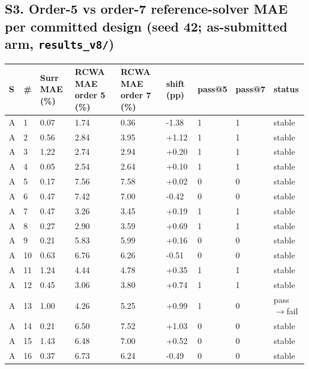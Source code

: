 \documentclass[11pt,a4paper]{article}
\newcounter{none}   %
\begin{document}
\begin{landscape}
\section*{\texorpdfstring{S3. Order-5 vs order-7 reference-solver MAE per committed design (seed 42; \textbf{as-submitted arm}, \texttt{results\_v8/})}{S3. Order-5 vs order-7 reference-solver MAE per committed design (seed 42; as-submitted arm, results\_v8/)}}

\begingroup
\setlength{\tabcolsep}{3pt}\footnotesize
{}
\label{stab:3}
{\def\LTcaptype{none} %
\begin{longtable}[]{@{}lllllllll@{}}
\toprule\noalign{}
S & \# & Surr MAE (\%) & RCWA MAE order 5 (\%) & RCWA MAE order 7 (\%) & shift (pp) & pass@5 & pass@7 & status \\
\midrule\noalign{}
\endhead
\bottomrule\noalign{}
\endlastfoot
A & 1 & 0.07 & 1.74 & 0.36 & -1.38 & 1 & 1 & stable \\
A & 2 & 0.56 & 2.84 & 3.95 & +1.12 & 1 & 1 & stable \\
A & 3 & 1.22 & 2.74 & 2.94 & +0.20 & 1 & 1 & stable \\
A & 4 & 0.05 & 2.54 & 2.64 & +0.10 & 1 & 1 & stable \\
A & 5 & 0.17 & 7.56 & 7.58 & +0.02 & 0 & 0 & stable \\
A & 6 & 0.47 & 7.42 & 7.00 & -0.42 & 0 & 0 & stable \\
A & 7 & 0.47 & 3.26 & 3.45 & +0.19 & 1 & 1 & stable \\
A & 8 & 0.27 & 2.90 & 3.59 & +0.69 & 1 & 1 & stable \\
A & 9 & 0.21 & 5.83 & 5.99 & +0.16 & 0 & 0 & stable \\
A & 10 & 0.63 & 6.76 & 6.26 & -0.51 & 0 & 0 & stable \\
A & 11 & 1.24 & 4.44 & 4.78 & +0.35 & 1 & 1 & stable \\
A & 12 & 0.45 & 3.06 & 3.80 & +0.74 & 1 & 1 & stable \\
A & 13 & 1.00 & 4.26 & 5.25 & +0.99 & 1 & 0 & pass\ensuremath{\rightarrow}fail \\
A & 14 & 0.21 & 6.50 & 7.52 & +1.03 & 0 & 0 & stable \\
A & 15 & 1.43 & 6.48 & 7.00 & +0.52 & 0 & 0 & stable \\
A & 16 & 0.37 & 6.73 & 6.24 & -0.49 & 0 & 0 & stable \\

\end{longtable}}
\end{landscape}
\end{document}
